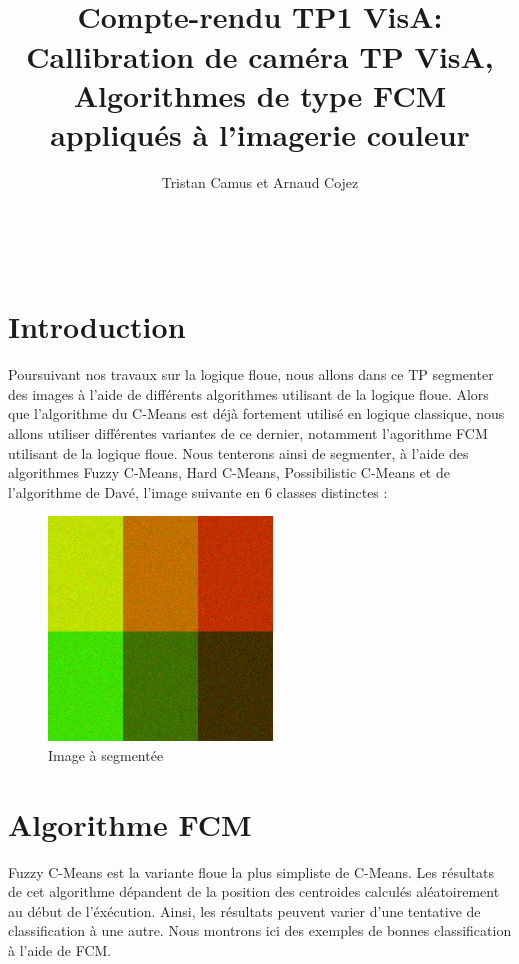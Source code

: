 \documentclass[a4paper,11pt]{article}
\title{
  \noindent\hrulefill \\
  \vspace{10mm} Compte-rendu TP1 VisA: Callibration de caméra
}
\title{TP VisA, Algorithmes de type FCM appliqués à l'imagerie couleur}
\author{Tristan Camus et Arnaud Cojez}
\date{}
\begin{document}
\maketitle

\noindent\hrulefill \\

\section{Introduction}

Poursuivant nos travaux sur la logique floue, nous allons dans ce TP segmenter des images à l'aide de différents algorithmes utilisant de la logique floue.
Alors que l'algorithme du C-Means est déjà fortement utilisé en logique classique, nous allons utiliser différentes variantes de ce dernier, notamment l'agorithme FCM utilisant de la logique floue. Nous tenterons ainsi de segmenter, à l'aide des algorithmes Fuzzy C-Means, Hard C-Means, Possibilistic C-Means et de l'algorithme de Davé, l'image suivante en 6 classes distinctes :

\begin{figure}[H]
\begin{center}
\includegraphics[width=225px]{../img/6_classes_RGB.png}
\end{center}
\caption{Image à segmentée}
\end{figure}

\clearpage

\section{Algorithme FCM}
Fuzzy C-Means est la variante floue la plus simpliste de C-Means. Les résultats de cet algorithme dépandent de la position des centroides calculés aléatoirement au début de l'éxécution. Ainsi, les résultats peuvent varier d'une tentative de classification à une autre. Nous montrons ici des exemples de bonnes classification à l'aide de FCM.
\end{document}
